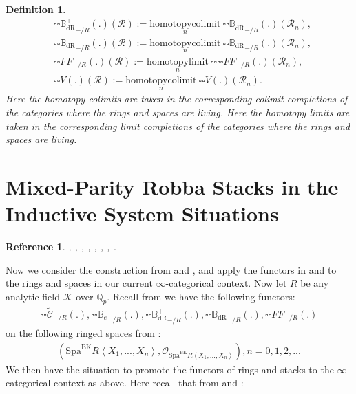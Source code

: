\documentclass[12pt]{book}
\newtheorem{definition}{Definition}
\newtheorem{reference}{Reference}
\begin{document}
\begin{definition}
\begin{align}
&{\square\square}{\mathbb{B}_\mathrm{dR}^+}_{-/R}(.)(\mathcal{R}):=\underset{n}{\mathrm{homotopycolimit}}~{\square\square}{\mathbb{B}_\mathrm{dR}^+}_{-/R}(.)(\mathcal{R}_n),\\
&{\square\square}{\mathbb{B}_\mathrm{dR}}_{-/R}(.)(\mathcal{R}):=\underset{n}{\mathrm{homotopycolimit}}~{\square\square}{\mathbb{B}_\mathrm{dR}}_{-/R}(.)(\mathcal{R}_n),\\
&{\square\square}{{FF}}_{-/R}(.)(\mathcal{R}):=\underset{n}{\mathrm{homotopylimit}}~{\square\square}{\square\square}{{FF}}_{-/R}(.)(\mathcal{R}_n),\\	
&{\square\square}V(.)(\mathcal{R}):=\underset{n}{\mathrm{homotopycolimit}}~{\square\square}V(.)(\mathcal{R}_n).
\end{align}
Here the homotopy colimits are taken in the corresponding colimit completions of the categories where the rings and spaces are living. Here the homotopy limits are taken in the corresponding limit completions of the categories where the rings and spaces are living.
\end{definition}










\newpage
\section{Mixed-Parity Robba Stacks in the Inductive System Situations}


\begin{reference}
\cite{KL1}, \cite{KL2}, \cite{Sch1}, \cite{Sch}, \cite{Fon}, \cite{FF}, \cite{F1}, \cite{Ta}.
\end{reference}


Now we consider the construction from \cite[Definition 9.3.3, Definition 9.3.5, Definition 9.3.11, Definition 9.3.9]{KL1} and \cite{KL2}, and apply the functors in \cite[Definition 9.3.3, Definition 9.3.5, Definition 9.3.11, Definition 9.3.9]{KL1} and \cite{KL2} to the rings and spaces in our current $\infty$-categorical context. Now let $R$ be any analytic field $\mathcal{K}$ over $\mathbb{Q}_p$. Recall from \cite[Definition 9.3.3, Definition 9.3.5, Definition 9.3.11, Definition 9.3.9]{KL1} we have the following functors:
\begin{align}
{\square\square}\widetilde{\mathcal{C}}_{-/R}(.),{\square\square}{\mathbb{B}_e}_{-/R}(.),{\square\square}{\mathbb{B}_\mathrm{dR}^+}_{-/R}(.),{\square\square}{\mathbb{B}_\mathrm{dR}}_{-/R}(.),{\square\square}{FF}_{-/R}(.)	
\end{align}
on the following ringed spaces from \cite{BK}:
\begin{align}
(\mathrm{Spa}^\mathrm{BK}R\left<X_1,...,X_n\right>,\mathcal{O}_{\mathrm{Spa}^\mathrm{BK}R\left<X_1,...,X_n\right>}),n=0,1,2,...	
\end{align}
We then have the situation to promote the functors of rings and stacks to the $\infty$-categorical context as above. Here recall that from \cite[Definition 9.3.3, Definition 9.3.5, Definition 9.3.11, Definition 9.3.9]{KL1} and \cite{KL2}:
\end{document}

